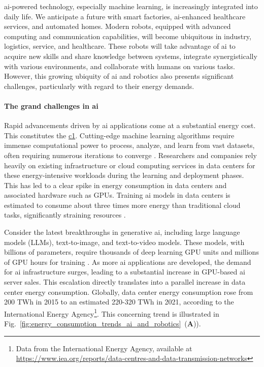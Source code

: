 \documentclass[12pt]{article}
\begin{document}
\Ac{ai}-powered technology, especially machine learning, is increasingly integrated into daily life. We anticipate a future with smart factories, \ac{ai}-enhanced healthcare services, and automated homes. Modern robots, equipped with advanced computing and communication capabilities, will become ubiquitous in industry, logistics, service, and healthcare. These robots will take advantage of \ac{ai} to acquire new skills and share knowledge between systems, integrate synergistically with various environments, and collaborate with humans on various tasks. However, this growing ubiquity of \ac{ai} and robotics also presents significant challenges, particularly with regard to their energy demands.

\paragraph*{The grand challenges in \ac{ai}}
Rapid advancements driven by \ac{ai} applications come at a substantial energy cost. This constitutes the \underline{\ac{c1}}. Cutting-edge machine learning algorithms require immense computational power to process, analyze, and learn from vast datasets, often requiring numerous iterations to converge \cite{Strubell2019EnergyPolicyConsiderations}. Researchers and companies rely heavily on existing infrastructure or cloud computing services in data centers for these energy-intensive workloads during the learning and deployment phases. This has led to a clear spike in energy consumption in data centers and associated hardware such as GPUs. Training \ac{ai} models in data centers is estimated to consume about three times more energy than traditional cloud tasks, significantly straining resources \cite{Thomas2023cloudusesmassive}.

Consider the latest breakthroughs in generative \ac{ai}, including large language models (LLMs), text-to-image, and text-to-video models. These models, with billions of parameters, require thousands of deep learning GPU units and millions of GPU hours for training \cite{Vanian2023ChatGPTgenerativeAI, Corbyn2023Nvidiachipmaker}. As more \ac{ai} applications are developed, the demand for \ac{ai} infrastructure surges, leading to a substantial increase in GPU-based \ac{ai} server sales. This escalation directly translates into a parallel increase in data center energy consumption. Globally, data center energy consumption rose from 200 TWh in 2015 to an estimated 220-320 TWh in 2021, according to the International Energy Agency\footnote{Data from the International Energy Agency, available at \url{https://www.iea.org/reports/data-centres-and-data-transmission-networks}}. This concerning trend is illustrated in Fig.~\ref{fig:energy_consumption_trends_ai_and_robotics}~(\textbf{A})).
\end{document}
